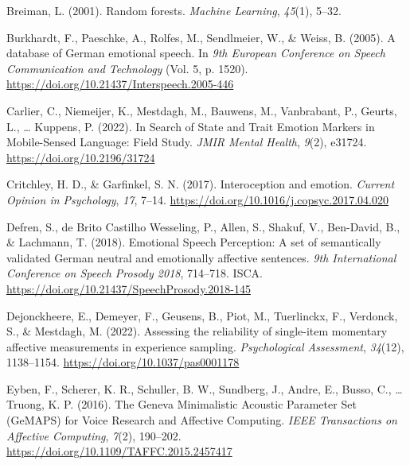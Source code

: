 \documentclass[
  english,
  man,floatsintext]{apa6}
\newlength{\cslhangindent}
\newenvironment{CSLReferences}[2] %
 {%
  \setlength{\parindent}{0pt}
  \ifodd #1 \everypar{\setlength{\hangindent}{\cslhangindent}}\ignorespaces\fi
  \ifnum #2 > 0
  \setlength{\parskip}{#2\baselineskip}
  \fi
 }%
 {}
\begin{document}
\begin{CSLReferences}{1}{0}
\leavevmode{}%
Breiman, L. (2001). Random forests. \emph{Machine Learning}, \emph{45}(1), 5--32.

\leavevmode{}%
Burkhardt, F., Paeschke, A., Rolfes, M., Sendlmeier, W., \& Weiss, B. (2005). A database of {German} emotional speech. In \emph{9th European Conference on Speech Communication and Technology} (Vol. 5, p. 1520). \url{https://doi.org/10.21437/Interspeech.2005-446}

\leavevmode{}%
Carlier, C., Niemeijer, K., Mestdagh, M., Bauwens, M., Vanbrabant, P., Geurts, L., \ldots{} Kuppens, P. (2022). In {Search} of {State} and {Trait Emotion Markers} in {Mobile-Sensed Language}: {Field Study}. \emph{JMIR Mental Health}, \emph{9}(2), e31724. \url{https://doi.org/10.2196/31724}

\leavevmode{}%
Critchley, H. D., \& Garfinkel, S. N. (2017). Interoception and emotion. \emph{Current Opinion in Psychology}, \emph{17}, 7--14. \url{https://doi.org/10.1016/j.copsyc.2017.04.020}

\leavevmode{}%
Defren, S., de Brito Castilho Wesseling, P., Allen, S., Shakuf, V., Ben-David, B., \& Lachmann, T. (2018). Emotional {Speech Perception}: {A} set of semantically validated {German} neutral and emotionally affective sentences. \emph{9th {International Conference} on {Speech Prosody} 2018}, 714--718. ISCA. \url{https://doi.org/10.21437/SpeechProsody.2018-145}

\leavevmode{}%
Dejonckheere, E., Demeyer, F., Geusens, B., Piot, M., Tuerlinckx, F., Verdonck, S., \& Mestdagh, M. (2022). Assessing the reliability of single-item momentary affective measurements in experience sampling. \emph{Psychological Assessment}, \emph{34}(12), 1138--1154. \url{https://doi.org/10.1037/pas0001178}

\leavevmode{}%
Eyben, F., Scherer, K. R., Schuller, B. W., Sundberg, J., Andre, E., Busso, C., \ldots{} Truong, K. P. (2016). The {Geneva Minimalistic Acoustic Parameter Set} ({GeMAPS}) for {Voice Research} and {Affective Computing}. \emph{IEEE Transactions on Affective Computing}, \emph{7}(2), 190--202. \url{https://doi.org/10.1109/TAFFC.2015.2457417}


\end{CSLReferences}
\end{document}
